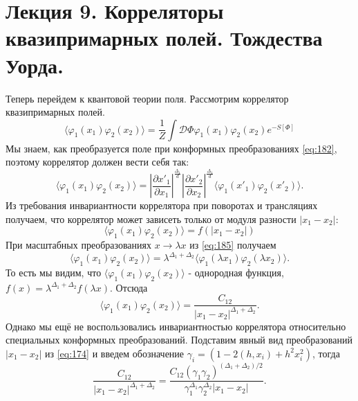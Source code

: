 \documentclass[a4paper,12pt]{article}
\theoremstyle{definition}
\theoremstyle{definition}
\theoremstyle{definition}
\begin{document}
\section{Лекция 9. Корреляторы квазипримарных полей. Тождества Уорда.}
\label{sec:lecture-9}

Теперь перейдем к квантовой теории поля. Рассмотрим коррелятор квазипримарных полей.
\begin{equation}
  \label{eq:184}
  \langle \varphi_{1}(x_{1}) \varphi_{2}(x_{2})\rangle = \frac{1}{Z} \int \mathcal{D} \Phi \varphi_{1}(x_{1})\varphi_{2}(x_{2}) e^{-S[\Phi]}
\end{equation}
Мы знаем, как преобразуется поле при конформных преобразованиях \eqref{eq:182}, поэтому коррелятор должен вести себя так:
\begin{equation}
  \label{eq:185}
  \langle \varphi_{1}(x_{1})\varphi_{2}(x_{2})\rangle = \left|\frac{\partial x'_{1}}{\partial x_{1}}\right|^{\frac{\Delta_{1}}{d}}\left| \frac{\partial x'_{2}}{\partial x_{2}}\right|^{\frac{\Delta_{1}}{d}} \langle \varphi_{1}(x'_{1})\varphi_{2}(x'_{2})\rangle .
\end{equation}
Из требования инвариантности коррелятора при поворотах и трансляциях получаем, что коррелятор может зависеть только от модуля разности $\left|x_{1}-x_{2}\right|$:
\begin{equation}
  \label{eq:186}
  \langle \varphi_{1}(x_{1}) \varphi_{2}(x_{2})\rangle = f(\left|x_{1}-x_{2}\right|)
\end{equation}
При масштабных преобразованиях $x\to \lambda x$ из \eqref{eq:185} получаем
\begin{equation}
  \label{eq:187}
   \langle \varphi_{1}(x_{1}) \varphi_{2}(x_{2})\rangle=\lambda^{\Delta_{1}+\Delta_{2}}  \langle \varphi_{1}(\lambda x_{1}) \varphi_{2}(\lambda x_{2})\rangle .
\end{equation}
То есть мы видим, что $ \langle \varphi_{1}(x_{1}) \varphi_{2}(x_{2})\rangle$ - однородная функция, $f(x)=\lambda^{\Delta_{1}+\Delta_{2}} f(\lambda x)$. Отсюда
\begin{equation}
  \label{eq:188}
   \langle \varphi_{1}(x_{1}) \varphi_{2}(x_{2})\rangle = \frac{C_{12}}{\left|x_{1}-x_{2}\right|^{\Delta_{1}+\Delta_{2}}}.
\end{equation}
Однако мы ещё не воспользовались инвариантностью коррелятора относительно специальных конформных преобразований. Подставим явный вид преобразований $\left|x_{1}-x_{2}\right|$ из \eqref{eq:174} и введем обозначение $\gamma_{i}=\left(1-2(h,x_{i})+h^{2}x_{i}^{2}\right)$, тогда
\begin{equation}
  \label{eq:189}
  \frac{C_{12}}{\left|x_{1}-x_{2}\right|^{\Delta_{1}+\Delta_{2}}}=\frac{C_{12}(\gamma_{1}\gamma_{2})^{(\Delta_{1}+\Delta_{2})/2}}{\gamma_{1}^{\Delta_{1}}\gamma_{2}^{\Delta_{2}} \left|x_{1}-x_{2}\right|}.
\end{equation}
\end{document}
